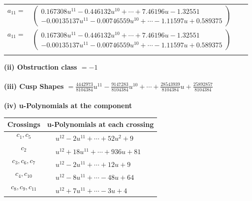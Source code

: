 \documentclass[1p]{elsarticle_modified}
\theoremstyle{definition}
\begin{document}
\begin{tabular}{m{7pt} m{180pt} m{7pt} m{180pt} }
\flushright $a_{11}=$&$\begin{pmatrix}0.167308 u^{11}-0.446132 u^{10}+\cdots+7.46196 u-1.32551\\-0.00135137 u^{11}-0.00746559 u^{10}+\cdots-1.11597 u+0.589375\end{pmatrix}$\\ \flushright $a_{11}=$&$\begin{pmatrix}0.167308 u^{11}-0.446132 u^{10}+\cdots+7.46196 u-1.32551\\-0.00135137 u^{11}-0.00746559 u^{10}+\cdots-1.11597 u+0.589375\end{pmatrix}$\\&\end{tabular}
\flushleft \textbf{(ii) Obstruction class $= -1$}\\~\\
\flushleft \textbf{(iii) Cusp Shapes $= \frac{4442973}{8104384} u^{11}-\frac{9147283}{8104384} u^{10}+\cdots+\frac{28543939}{8104384} u+\frac{25892857}{8104384}$}\\~\\
\newpage\renewcommand{\arraystretch}{1}
\flushleft \textbf{(iv) u-Polynomials at the component}\newline \\
\begin{tabular}{m{50pt}|m{274pt}}
Crossings & \hspace{64pt}u-Polynomials at each crossing \\
\hline $$\begin{aligned}c_{1},c_{5}\end{aligned}$$&$\begin{aligned}
&u^{12}-2 u^{11}+\cdots+52 u^2+9
\end{aligned}$\\
\hline $$\begin{aligned}c_{2}\end{aligned}$$&$\begin{aligned}
&u^{12}+18 u^{11}+\cdots+936 u+81
\end{aligned}$\\
\hline $$\begin{aligned}c_{3},c_{6},c_{7}\end{aligned}$$&$\begin{aligned}
&u^{12}-2 u^{11}+\cdots+12 u+9
\end{aligned}$\\
\hline $$\begin{aligned}c_{4},c_{10}\end{aligned}$$&$\begin{aligned}
&u^{12}-8 u^{11}+\cdots-48 u+64
\end{aligned}$\\
\hline $$\begin{aligned}c_{8},c_{9},c_{11}\end{aligned}$$&$\begin{aligned}
&u^{12}+7 u^{11}+\cdots-3 u+4
\end{aligned}$\\
\hline
\end{tabular}\\~\\
\end{document}

